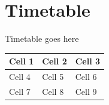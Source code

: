 
\section{Timetable}
\label{sec:Timetable}

\large{\raggedright
Timetable goes here\\
}

\begin{center}
\begin{tabularx}{\textwidth}{ | X | X | X | }
\hline
Cell 1 & Cell 2 & Cell 3 \\ \hline
Cell 4 & Cell 5 & Cell 6 \\ \hline
Cell 7 & Cell 8 & Cell 9 \\ \hline
\end{tabularx}
\end{center}
